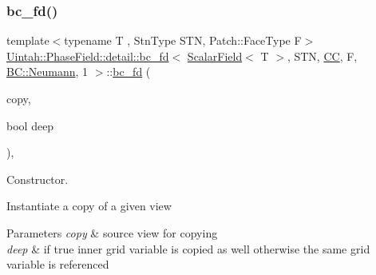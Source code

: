 \subsubsection{\texorpdfstring{bc\+\_\+fd()}{bc\_fd()}\hspace{0.1cm}{\footnotesize\ttfamily [1/3]}}
{\footnotesize\ttfamily template$<$typename T , Stn\+Type S\+TN, Patch\+::\+Face\+Type F$>$ \\
\hyperlink{classUintah_1_1PhaseField_1_1detail_1_1bc__fd}{Uintah\+::\+Phase\+Field\+::detail\+::bc\+\_\+fd}$<$ \hyperlink{structUintah_1_1PhaseField_1_1ScalarField}{Scalar\+Field}$<$ T $>$, S\+TN, \hyperlink{namespaceUintah_1_1PhaseField_a33d355affda78a83f45755ba8388cedda22303704507d024d1d6508ed9859a85a}{CC}, F, \hyperlink{namespaceUintah_1_1PhaseField_a148fba372aa3be96fd6eede7a2fa10b5ab8537a769dbc90cb1762215441212152}{B\+C\+::\+Neumann}, 1 $>$\+::\hyperlink{classUintah_1_1PhaseField_1_1detail_1_1bc__fd}{bc\+\_\+fd} (\begin{DoxyParamCaption}\item[{const \hyperlink{classUintah_1_1PhaseField_1_1detail_1_1bc__fd}{bc\+\_\+fd}$<$ \hyperlink{structUintah_1_1PhaseField_1_1ScalarField}{Scalar\+Field}$<$ T $>$, S\+TN, \hyperlink{namespaceUintah_1_1PhaseField_a33d355affda78a83f45755ba8388cedda22303704507d024d1d6508ed9859a85a}{CC}, F, \hyperlink{namespaceUintah_1_1PhaseField_a148fba372aa3be96fd6eede7a2fa10b5ab8537a769dbc90cb1762215441212152}{B\+C\+::\+Neumann}, 1 $>$ $\ast$}]{copy,  }\item[{bool}]{deep }\end{DoxyParamCaption})\hspace{0.3cm}{\ttfamily [inline]}, {\ttfamily [protected]}}



Constructor. 

Instantiate a copy of a given view


\begin{DoxyParams}{Parameters}
{\em copy} & source view for copying \\
\hline
{\em deep} & if true inner grid variable is copied as well otherwise the same grid variable is referenced \\
\hline
\end{DoxyParams}
\mbox{\label{classUintah_1_1PhaseField_1_1detail_1_1bc__fd_3_01ScalarField_3_01T_01_4_00_01STN_00_01CC_00_01F_00_01BC_1_1Neumann_00_011_01_4_aa71e2e363f226745258c02b0076c4044}} 
